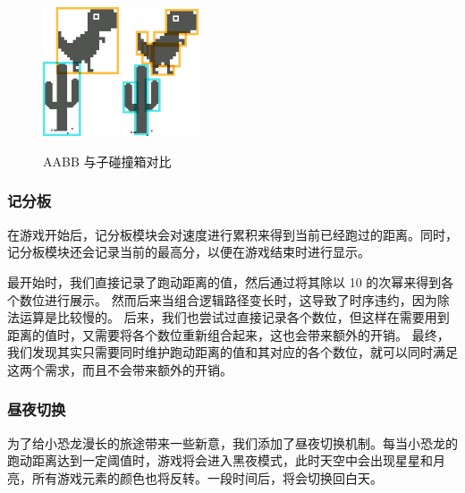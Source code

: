\documentclass[UTF8, 11pt, fontset=none]{ctexart}
\begin{document}
\begin{figure}[H]
    \centering
    \includegraphics[width=0.2\textwidth]{images/aabb.png}
    \includegraphics[width=0.2\textwidth]{images/collision-box.png}
    \vspace{-16pt}
    \caption{AABB 与子碰撞箱对比}
    \label{collision}
\end{figure}

\subsubsection{记分板}

在游戏开始后，记分板模块会对速度进行累积来得到当前已经跑过的距离。同时，记分板模块还会记录当前的最高分，以便在游戏结束时进行显示。

最开始时，我们直接记录了跑动距离的值，然后通过将其除以 10 的次幂来得到各个数位进行展示。
然而后来当组合逻辑路径变长时，这导致了时序违约，因为除法运算是比较慢的。
后来，我们也尝试过直接记录各个数位，但这样在需要用到距离的值时，又需要将各个数位重新组合起来，这也会带来额外的开销。
最终，我们发现其实只需要同时维护跑动距离的值和其对应的各个数位，就可以同时满足这两个需求，而且不会带来额外的开销。

\subsubsection{昼夜切换}

为了给小恐龙漫长的旅途带来一些新意，我们添加了昼夜切换机制。每当小恐龙的跑动距离达到一定阈值时，游戏将会进入黑夜模式，此时天空中会出现星星和月亮，所有游戏元素的颜色也将反转。一段时间后，将会切换回白天。
\end{document}
